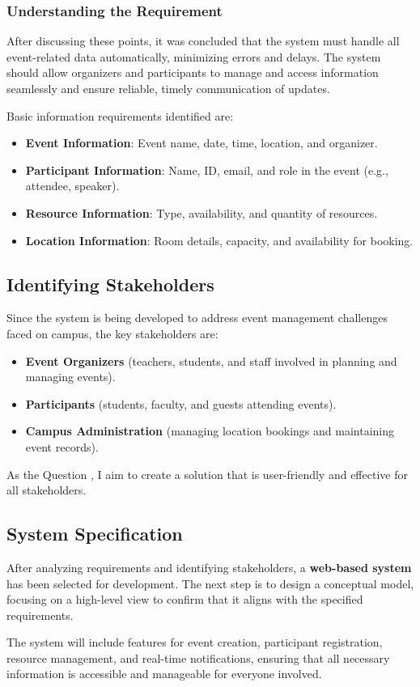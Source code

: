 \subsubsection{Understanding the Requirement}

After discussing these points, it was concluded that the system must handle all event-related data automatically, minimizing errors and delays. The system should allow organizers and participants to manage and access information seamlessly and ensure reliable, timely communication of updates.

Basic information requirements identified are:
\begin{itemize}
    \item \textbf{Event Information}: Event name, date, time, location, and organizer.
    \item \textbf{Participant Information}: Name, ID, email, and role in the event (e.g., attendee, speaker).
    \item \textbf{Resource Information}: Type, availability, and quantity of resources.
    \item \textbf{Location Information}: Room details, capacity, and availability for booking.
\end{itemize}

\subsection{Identifying Stakeholders}

Since the system is being developed to address event management challenges faced on campus, the key stakeholders are:

\begin{itemize}
    \item \textbf{Event Organizers} (teachers, students, and staff involved in planning and managing events).
    \item \textbf{Participants} (students, faculty, and guests attending events).
    \item \textbf{Campus Administration} (managing location bookings and maintaining event records).
\end{itemize}

As the Question , I aim to create a solution that is user-friendly and effective for all stakeholders.

\subsection{System Specification}

After analyzing requirements and identifying stakeholders, a \textbf{web-based system} has been selected for development. The next step is to design a conceptual model, focusing on a high-level view to confirm that it aligns with the specified requirements.

The system will include features for event creation, participant registration, resource management, and real-time notifications, ensuring that all necessary information is accessible and manageable for everyone involved.
